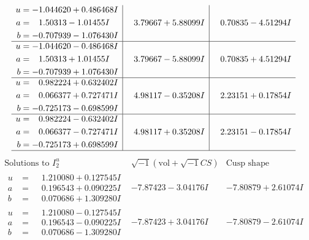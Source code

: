 \documentclass[1p]{elsarticle_modified}
\theoremstyle{definition}
\newcommand{\I}{\sqrt{-1}}
\begin{document}
$$\begin{array}{c|c|c}
\begin{aligned}
u &= -1.044620 + 0.486468 I \\
a &= \phantom{-}1.50313 - 1.01455 I \\
b &= -0.707939 - 1.076430 I\end{aligned}
 & \phantom{-}3.79667 + 5.88099 I & \phantom{-}0.70835 - 4.51294 I \\ \hline\begin{aligned}
u &= -1.044620 - 0.486468 I \\
a &= \phantom{-}1.50313 + 1.01455 I \\
b &= -0.707939 + 1.076430 I\end{aligned}
 & \phantom{-}3.79667 - 5.88099 I & \phantom{-}0.70835 + 4.51294 I \\ \hline\begin{aligned}
u &= \phantom{-}0.982224 + 0.632402 I \\
a &= \phantom{-}0.066377 + 0.727471 I \\
b &= -0.725173 - 0.698599 I\end{aligned}
 & \phantom{-}4.98117 - 0.35208 I & \phantom{-}2.23151 + 0.17854 I \\ \hline\begin{aligned}
u &= \phantom{-}0.982224 - 0.632402 I \\
a &= \phantom{-}0.066377 - 0.727471 I \\
b &= -0.725173 + 0.698599 I\end{aligned}
 & \phantom{-}4.98117 + 0.35208 I & \phantom{-}2.23151 - 0.17854 I\\
 \hline 
 \end{array}$$\newpage$$\begin{array}{c|c|c}  
\text{Solutions to }I^u_{2}& \I (\text{vol} + \sqrt{-1}CS) & \text{Cusp shape}\\
 \hline 
\begin{aligned}
u &= \phantom{-}1.210080 + 0.127545 I \\
a &= \phantom{-}0.196543 + 0.090225 I \\
b &= \phantom{-}0.070686 + 1.309280 I\end{aligned}
 & -7.87423 - 3.04176 I & -7.80879 + 2.61074 I \\ \hline\begin{aligned}
u &= \phantom{-}1.210080 - 0.127545 I \\
a &= \phantom{-}0.196543 - 0.090225 I \\
b &= \phantom{-}0.070686 - 1.309280 I\end{aligned}
 & -7.87423 + 3.04176 I & -7.80879 - 2.61074 I \\ \hline\begin{aligned}

\end{aligned}
\end{array}$$
\end{document}
